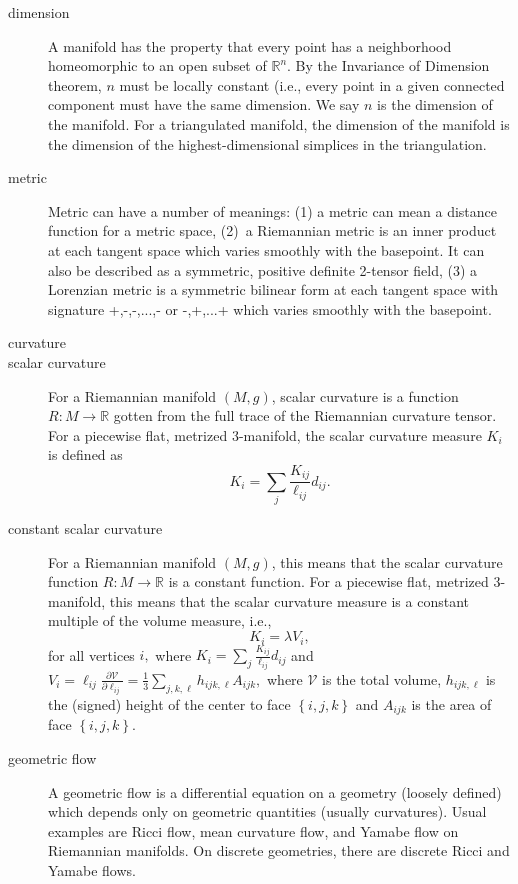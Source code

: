 \begin{description}
\item[dimension] A manifold has the property that every point has a
neighborhood homeomorphic to an open subset of $\mathbb{R}^{n}.$ By the
Invariance of Dimension theorem, $n$ must be locally constant (i.e., every
point in a given connected component must have the same dimension. We say $n$
is the dimension of the manifold. For a triangulated manifold, the dimension
of the manifold is the dimension of the highest-dimensional simplices in the
triangulation.

\item[metric] Metric can have a number of meanings: (1) a metric can mean a
distance function for a metric space, (2)\ a Riemannian metric is an inner
product at each tangent space which varies smoothly with the basepoint. It
can also be described as a symmetric, positive definite 2-tensor field, (3)
a Lorenzian metric is a symmetric bilinear form at each tangent space with
signature +,-,-,...,- or -,+,...+ which varies smoothly with the basepoint.

\item[curvature] 

\item[scalar curvature] For a Riemannian manifold $\left( M,g\right) $,
scalar curvature is a function $R:M\rightarrow \mathbb{R}$ gotten from the
full trace of the Riemannian curvature tensor. For a piecewise flat,
metrized 3-manifold, the scalar curvature measure $K_{i}$ is defined as 
\[
K_{i}=\sum_{j}\frac{K_{ij}}{\ell _{ij}}d_{ij}.
\]

\item[constant scalar curvature] For a Riemannian manifold $\left(
M,g\right) $, this means that the scalar curvature function $R:M\rightarrow 
\mathbb{R}$ is a constant function. For a piecewise flat, metrized
3-manifold, this means that the scalar curvature measure is a constant
multiple of the volume measure, i.e., 
\[
K_{i}=\lambda V_{i},
\]%
for all vertices $i,$ where $K_{i}=\sum_{j}\frac{K_{ij}}{\ell _{ij}}d_{ij}$
and $V_{i}=\ell _{ij}\frac{\partial \mathcal{V}}{\partial \ell _{ij}}=\frac{1%
}{3}\sum_{j,k,\ell }h_{ijk,\ell }A_{ijk},$ where $\mathcal{V}$ is the total
volume, $h_{ijk,\ell }$ is the (signed) height of the center to face $%
\left\{ i,j,k\right\} $ and $A_{ijk}$ is the area of face $\left\{
i,j,k\right\} .$

\item[geometric flow] A geometric flow is a differential equation on a
geometry (loosely defined) which depends only on geometric quantities
(usually curvatures). Usual examples are Ricci flow, mean curvature flow,
and Yamabe flow on Riemannian manifolds. On discrete geometries, there are
discrete Ricci and Yamabe flows.


\end{description}

